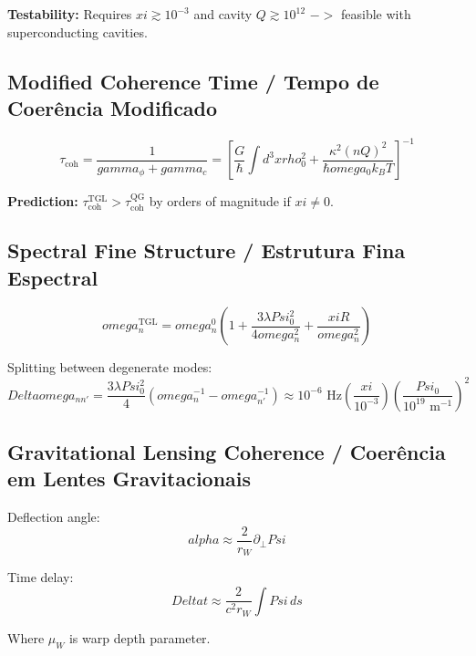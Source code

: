 \documentclass[12pt,a4paper]{article}
\def\Psi{Psi}%
\def\to{ -> }%
\def\alpha{alpha}%
\def\gamma{gamma}%
\def\xi{xi}%
\def\rho{rho}%
\def\omega{omega}%
\def\Delta{Delta}%
\begin{document}
\textbf{Testability:} Requires $\xi \gtrsim 10^{-3}$ and cavity $Q \gtrsim 10^{12}$ $\to$ feasible with superconducting cavities.

\subsection{Modified Coherence Time / Tempo de Coerência Modificado}

\begin{equation}
\tau_{\text{coh}} = \frac{1}{\gamma_\phi + \gamma_c} = \left[\frac{G}{\hbar}\int d^3x \rho_0^2 + \frac{\kappa^2(nQ)^2}{\hbar\omega_0 k_B T}\right]^{-1}
\end{equation}

\textbf{Prediction:} $\tau_{\text{coh}}^{\text{TGL}} > \tau_{\text{coh}}^{\text{QG}}$ by orders of magnitude if $\xi \neq 0$.

\subsection{Spectral Fine Structure / Estrutura Fina Espectral}

\begin{equation}
\omega_n^{\text{TGL}} = \omega_n^0\left(1 + \frac{3\lambda\Psi_0^2}{4\omega_n^2} + \frac{\xi R}{\omega_n^2}\right)
\end{equation}

Splitting between degenerate modes:
\begin{equation}
\Delta\omega_{nn'} = \frac{3\lambda\Psi_0^2}{4}(\omega_n^{-1} - \omega_{n'}^{-1}) \approx 10^{-6}\text{ Hz}\left(\frac{\xi}{10^{-3}}\right)\left(\frac{\Psi_0}{10^{19}\text{ m}^{-1}}\right)^2
\end{equation}

\subsection{Gravitational Lensing Coherence / Coerência em Lentes Gravitacionais}

Deflection angle:
\begin{equation}
\alpha \approx \frac{2}{r_W}\partial_\perp\Psi
\end{equation}

Time delay:
\begin{equation}
\Delta t \approx \frac{2}{c^2 r_W}\int\Psi\, ds
\end{equation}

Where $\mu_W$ is warp depth parameter.
\end{document}
